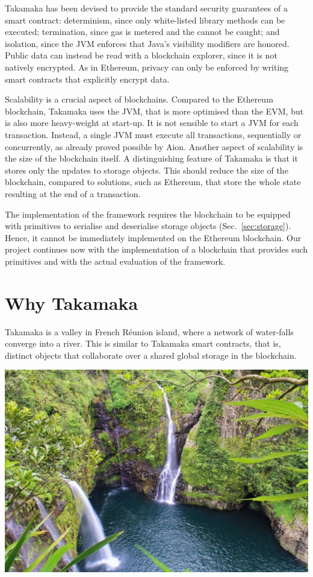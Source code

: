 \documentclass[10pt]{llncs}
\def\codesize{}
\def\<#1>{\codeid{#1}}
\newcommand{\codeid}[1]{\ifmmode{\mbox{\codesize\ttfamily{#1}}}\else{\codesize\ttfamily #1}\fi}
\begin{document}
Takamaka has been devised to provide the standard security guarantees of
a smart contract: determinism, since only white-listed library methods can be
executed; termination, since gas is metered and the \<OutOfGasError> cannot
be caught; and isolation, since the JVM enforces that Java's visibility
modifiers are honored. Public data can instead be read with a blockchain
explorer, since it is not natively encrypted. As in Ethereum, privacy can only be enforced
by writing smart contracts that explicitly encrypt data.

Scalability is a crucial aspect of blockchains. Compared to the Ethereum blockchain,
Takamaka uses the JVM, that is more optimised than the EVM, but is also
more heavy-weight at start-up. It is not sensible to start a JVM for each transaction.
Instead, a single JVM must execute all transactions, sequentially or concurrently,
as already proved possible by Aion. Another aspect of scalability is the size of the
blockchain itself. A distinguishing feature of Takamaka is that it
stores only the updates to storage objects. This should reduce the size of the blockchain,
compared to solutions, such as Ethereum, that store the whole state resulting at the end of
a transaction.

The implementation of the framework requires the blockchain to be
equipped with primitives to serialise and deserialise storage objects
(Sec.~\ref{sec:storage}). Hence, it cannot be immediately implemented on
the Ethereum blockchain. Our project continues now with the
implementation of a blockchain that provides such primitives
and with the actual evaluation of the framework.

\newpage
\section{Why Takamaka}



Takamaka is a valley in French R\'eunion island, where a network of water-falls converge into 
a river. This is similar to Takamaka smart contracts, that is, distinct objects that collaborate 
over a shared global storage in the blockchain.

\begin{center}
  \includegraphics[width=0.8\linewidth]{barrage_takamaka_1.jpg}
\end{center}
\newpage



\end{document}
